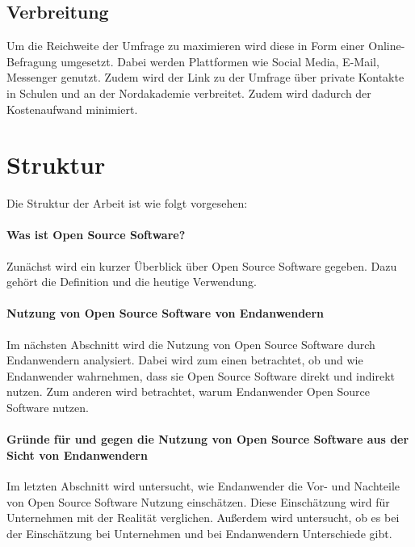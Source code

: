 \documentclass[a4paper]{article}
\begin{document}
		\subsection{Verbreitung}
			Um die Reichweite der Umfrage zu maximieren wird diese in Form einer Online-Befragung umgesetzt. Dabei werden Plattformen wie Social Media, E-Mail, Messenger genutzt. Zudem wird der Link zu der Umfrage über private Kontakte in Schulen und an der Nordakademie verbreitet. Zudem wird dadurch der Kostenaufwand minimiert.
	   
	   
	\section{Struktur}
    		Die Struktur der Arbeit ist wie folgt vorgesehen:
    
    		\paragraph{Was ist Open Source Software?}
    		Zunächst wird ein kurzer Überblick über Open Source Software gegeben. Dazu gehört die Definition und die heutige Verwendung.
		
		\paragraph{Nutzung von Open Source Software von Endanwendern}
		Im nächsten Abschnitt wird die Nutzung von Open Source Software durch Endanwendern analysiert. Dabei wird zum einen betrachtet, ob und wie Endanwender wahrnehmen, dass sie Open Source Software direkt und indirekt nutzen.
		Zum anderen wird betrachtet, warum Endanwender Open Source Software nutzen.
		
		\paragraph{Gründe für und gegen die Nutzung von Open Source Software aus der Sicht von Endanwendern}
		Im letzten Abschnitt wird untersucht, wie Endanwender die Vor- und Nachteile von Open Source Software Nutzung einschätzen.
		Diese Einschätzung wird für Unternehmen mit der Realität verglichen.
		Außerdem wird untersucht, ob es bei der Einschätzung bei Unternehmen und bei Endanwendern Unterschiede gibt.
	
    \clearpage
    \nocite{*}
    \printbibliography
\end{document}

